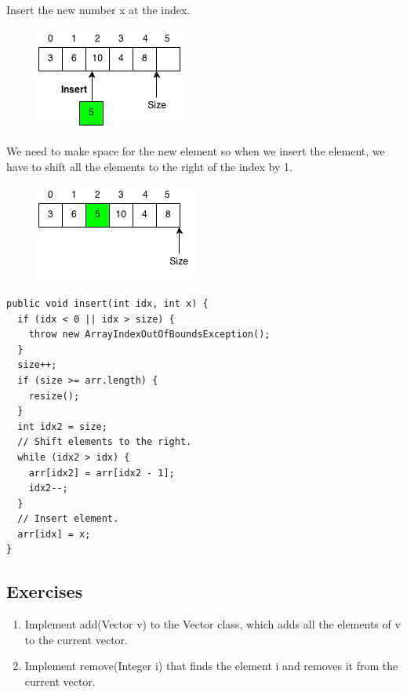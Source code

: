 \documentclass[11pt,oneside]{book}
\makeatletter
\def\maxwidth#1{\ifdim\Gin@nat@width>#1 #1\else\Gin@nat@width\fi}
\makeatother
\begin{document}
Insert the new number x at the index.

\vspace{5px}\begin{figure}[H]\centering
        \includegraphics[width=0.66\maxwidth{\textwidth}]{vectorinsert.png}
        \end{figure}

We need to make space for the new element so when we insert the element, we have to shift all the elements to the right of the index by 1.

\vspace{5px}\begin{figure}[H]\centering
        \includegraphics[width=0.66\maxwidth{\textwidth}]{vectorinsert2.png}
        \end{figure}

\begin{lstlisting}
public void insert(int idx, int x) {
  if (idx < 0 || idx > size) {
    throw new ArrayIndexOutOfBoundsException();
  }
  size++;
  if (size >= arr.length) {
    resize();
  }
  int idx2 = size;
  // Shift elements to the right.
  while (idx2 > idx) {
    arr[idx2] = arr[idx2 - 1];
    idx2--;
  }
  // Insert element.
  arr[idx] = x;
}
\end{lstlisting}

\subsection{Exercises}

\begin{enumerate}
\item Implement add(Vector v) to the Vector class, which adds all the elements of v to the current vector.
\item Implement remove(Integer i) that finds the element i and removes it from the current vector.
\end{enumerate}
\end{document}
